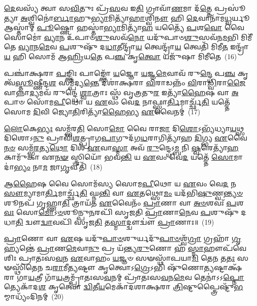{\anuvakamend[{\-\ul{𑌵𑌾}\-𑌚𑍋 𑌹𑌵᳴\-\ul{𑌮}\-𑌭𑌿𑌘𑍃᳴𑌤𑌾𑌨𑌾𑌂 𑌗𑍃𑌹𑍍𑌣𑌾\-\ul{𑌤𑍍𑌯𑍁}\-𑌤 𑌪𑌞𑍍𑌚᳴𑌵𑌿𑍞𑌶𑌤𑌿𑌶𑍍𑌚}]}%

\-\ul{𑌦𑍇}\-𑌵𑌸𑍍𑌯᳴ 𑌤𑍍𑌵𑌾 𑌸\-\ul{𑌵𑌿}\-𑌤𑍁𑌃 𑌪𑍍𑌰᳴\-\ul{𑌸}\-𑌵 𑌇\-\ul{𑌤𑌿} 𑌗𑍍𑌰𑌾𑌵𑌾᳴\-\ul{𑌣}\-𑌮𑌾 𑌦᳴\-\ul{𑌤𑍍𑌤𑍇} 𑌪𑍍𑌰𑌸𑍂॑𑌤𑍍𑌯𑌾 \ul{𑌅}\-𑌶𑍍𑌵𑌿𑌨𑍋॑\-\ul{𑌰𑍍𑌬𑌾}\-𑌹𑍁\-\ul{𑌭𑍍𑌯𑌾}\-𑌮𑌿𑌤𑍍𑌯𑌾᳴\-\ul{𑌹𑌾}\-𑌶𑍍𑌵𑌿\-\ul{𑌨𑍗} 𑌹𑌿 \ul{𑌦𑍇}\-𑌵𑌾𑌨𑌾᳴𑌮\-\ul{𑌧𑍍𑌵}\-𑌰𑍍𑌯𑍂 𑌆𑌸𑍍𑌤𑌾॑𑌮𑍍 \ul{𑌪𑍂}\-𑌷𑍍𑌣𑍋 𑌹𑌸𑍍𑌤𑌾॑\-\ul{𑌭𑍍𑌯𑌾}\-𑌮𑌿𑌤𑍍𑌯𑌾᳴\-\ul{𑌹} 𑌯𑌤𑍍𑌯𑍈᳴ \ul{𑌪}\-𑌶\-\ul{𑌵𑍋} 𑌵𑍈 𑌸𑍋𑌮𑍋॑ \ul{𑌵𑍍𑌯𑌾}\-𑌨 𑌉᳴𑌪𑌾𑍞\-\ul{𑌶𑍁}\-𑌸𑌵᳴\-\ul{𑌨𑍋} 𑌯𑌦𑍁᳴𑌪𑌾𑍞\-\ul{𑌶𑍁}\-𑌸𑌵᳴𑌨\-\ul{𑌮}\-𑌭𑌿 𑌮𑌿𑌮𑍀᳴𑌤𑍇 \ul{𑌵𑍍𑌯𑌾}\-𑌨\-\ul{𑌮𑍇}\-𑌵 \ul{𑌪}\-𑌶𑍁𑌷𑍁᳴ 𑌦\-\ul{𑌧𑌾}\-𑌤𑍀𑌨𑍍𑌦𑍍𑌰𑌾᳴\-\ul{𑌯} 𑌤𑍍𑌵𑍇𑌨𑍍𑌦𑍍𑌰𑌾᳴\-\ul{𑌯} 𑌤𑍍𑌵𑍇𑌤𑌿᳴ 𑌮𑌿𑌮𑍀\-\ul{𑌤} 𑌇𑌨𑍍𑌦𑍍𑌰𑌾᳴\-\ul{𑌯} 𑌹𑌿 𑌸𑍋𑌮᳴ 𑌆\-\ul{𑌹𑍍𑌰𑌿}\-𑌯\-\ul{𑌤𑍇} 𑌪\-\ul{𑌞𑍍𑌚} 𑌕𑍃\-\ul{𑌤𑍍𑌵𑍋} 𑌯𑌜𑍁᳴𑌷𑌾 𑌮𑌿𑌮𑍀𑌤𑍇~(16)

𑌪𑌞𑍍𑌚𑌾॑𑌕𑍍𑌷𑌰𑌾 \ul{𑌪}\-𑌙𑍍𑌕𑍍𑌤𑌿𑌃 𑌪𑌾𑌙𑍍𑌕𑍍𑌤𑍋᳴ \ul{𑌯}\-𑌜𑍍𑌞𑍋 \ul{𑌯}\-𑌜𑍍𑌞\-\ul{𑌮𑍇}\-𑌵𑌾𑌵᳴ 𑌰𑍁\-\ul{𑌨𑍍𑌦𑍍𑌧𑍇} 𑌪\-\ul{𑌞𑍍𑌚} 𑌕𑍃𑌤𑍍𑌵᳴\-\ul{𑌸𑍍𑌤𑍂}\-𑌷𑍍𑌣𑍀𑌨𑍍𑌦\-\ul{𑌶} 𑌸𑌮𑍍𑌪᳴𑌦𑍍𑌯\-\ul{𑌨𑍍𑌤𑍇} 𑌦𑌶𑌾॑𑌕𑍍𑌷𑌰𑌾 \ul{𑌵𑌿}\-𑌰𑌾𑌡𑌨𑍍𑌨𑌂᳴ \ul{𑌵𑌿}\-𑌰𑌾\-\ul{𑌡𑍍𑌵𑌿}\-𑌰𑌾\-\ul{𑌜𑍈}\-𑌵𑌾𑌨𑍍𑌨𑌾\-\ul{𑌦𑍍𑌯}\-𑌮𑌵᳴ 𑌰𑍁𑌨𑍍𑌦𑍍𑌧𑍇 \ul{𑌶𑍍𑌵𑌾}\-𑌤𑍍𑌰𑌾𑌃 𑌸𑍍𑌥᳴ 𑌵𑍃\-\ul{𑌤𑍍𑌰}\-𑌤𑍁\-\ul{𑌰} 𑌇𑌤𑍍𑌯𑌾᳴\-\ul{𑌹𑍈}\-𑌷 𑌵𑌾 \ul{𑌅}\-𑌪𑌾𑍞 𑌸𑍋᳴𑌮\-\ul{𑌪𑍀}\-𑌥𑍋 𑌯 \ul{𑌏}\-𑌵𑌂 𑌵𑍇\-\ul{𑌦} 𑌨𑌾𑌫𑍍𑌸𑍍𑌵𑌾\-\ul{𑌰𑍍𑌤𑌿}\-𑌮𑌾𑌰𑍍𑌚𑍍𑌛᳴\-\ul{𑌤𑌿} 𑌯𑌤𑍍𑌤𑍇᳴ 𑌸𑍋𑌮 \ul{𑌦𑌿}\-𑌵𑌿 𑌜𑍍𑌯𑍋\-\ul{𑌤𑌿}\-𑌰𑌿𑌤𑍍𑌯𑌾᳴\-\ul{𑌹𑍈}\-𑌭𑍍𑌯 \ul{𑌏}\-𑌵𑍈𑌨𑌮𑍍॑~(17)

\-\ul{𑌲𑍋}\-𑌕𑍇\-\ul{𑌭𑍍𑌯𑌃} 𑌸𑌮𑍍𑌭᳴𑌰\-\ul{𑌤𑌿} 𑌸𑍋\-\ul{𑌮𑍋} 𑌵𑍈 𑌰𑌾\-\ul{𑌜𑌾} 𑌦𑌿\-\ul{𑌶𑍋}\-\-𑌽𑌭𑍍𑌯᳴𑌧𑍍𑌯𑌾\-\ul{𑌯}\-𑌥𑍍𑌸 𑌦𑌿𑌶𑍋\-𑌽\-\ul{𑌨𑍁} 𑌪𑍍𑌰𑌾𑌵𑌿᳴\-\ul{𑌶}\-𑌤𑍍𑌪𑍍𑌰𑌾𑌗\-\ul{𑌪𑌾}\-𑌗𑍁𑌦᳴𑌗\-\ul{𑌧}\-𑌰𑌾𑌗𑌿𑌤𑍍𑌯𑌾᳴𑌹 \ul{𑌦𑌿}\-𑌗𑍍𑌭𑍍𑌯 \ul{𑌏}\-𑌵𑍈\-\ul{𑌨}\-\-\ul{𑍞} 𑌸𑌮𑍍𑌭᳴\-\ul{𑌰}\-𑌤𑍍𑌯\-\ul{𑌥𑍋} 𑌦𑌿𑌶᳴ \ul{𑌏}\-𑌵𑌾\-\ul{𑌸𑍍𑌮𑌾} 𑌅𑌵᳴ \ul{𑌰𑍁}\-𑌨𑍍𑌦𑍍𑌧𑍇\-𑌽\-\ul{𑌮𑍍𑌬} 𑌨𑌿 \ul{𑌷𑍍𑌵}\-𑌰𑍇𑌤𑍍𑌯𑌾᳴\-\ul{𑌹} 𑌕𑌾𑌮𑍁᳴𑌕𑌾 𑌏\-\ul{𑌨}\-\-\ul{𑍟} 𑌸𑍍𑌤𑍍𑌰𑌿𑌯𑍋᳴ 𑌭𑌵\-\ul{𑌨𑍍𑌤𑌿} 𑌯 \ul{𑌏}\-𑌵𑌂 𑌵𑍇\-\ul{𑌦} 𑌯𑌤𑍍𑌤𑍇᳴ \ul{𑌸𑍋}\-𑌮𑌾𑌦𑌾॑\-\ul{𑌭𑍍𑌯𑌂} 𑌨𑌾\-\ul{𑌮} 𑌜𑌾\-\ul{𑌗𑍃}\-𑌵𑍀𑌤𑌿᳴~(18)

\-\ul{𑌆}\-\-\ul{𑌹𑍈}\-𑌷 𑌵𑍈 𑌸𑍋𑌮᳴𑌸𑍍𑌯 𑌸𑍋𑌮\-\ul{𑌪𑍀}\-𑌥𑍋 𑌯 \ul{𑌏}\-𑌵𑌂 𑌵𑍇\-\ul{𑌦} 𑌨 \ul{𑌸𑍗}\-𑌮𑍍𑌯𑌾𑌮𑌾\-\ul{𑌰𑍍𑌤𑌿}\-𑌮𑌾𑌰𑍍𑌚𑍍𑌛᳴\-\ul{𑌤𑌿} 𑌘𑍍𑌨\-\ul{𑌨𑍍𑌤𑌿} 𑌵𑌾 \ul{𑌏}\-𑌤𑌥𑍍𑌸𑍋\-\ul{𑌮𑌂} 𑌯𑌦᳴𑌭𑌿\-\ul{𑌷𑍁}\-𑌣𑍍𑌵\-\ul{𑌨𑍍𑌤𑍍𑌯}\-\-\ul{𑍞}\-𑌶𑍂𑌨𑌪᳴ 𑌗𑍃𑌹𑍍𑌣𑌾\-\ul{𑌤𑌿} 𑌤𑍍𑌰𑌾𑌯᳴𑌤 \ul{𑌏}\-𑌵𑍈𑌨𑌂᳴ \ul{𑌪𑍍𑌰𑌾}\-𑌣𑌾 𑌵𑌾 \ul{𑌅}\-\-\ul{𑍞}\-𑌶𑌵𑌃᳴ \ul{𑌪}\-𑌶\-\ul{𑌵𑌃} 𑌸𑍋\-\ul{𑌮𑍋}\-\-𑌽\-\ul{𑍞}\-𑌶𑍂𑌨𑍍𑌪𑍁\-\ul{𑌨}\-𑌰𑌪𑌿᳴ 𑌸𑍃𑌜𑌤𑌿 \ul{𑌪𑍍𑌰𑌾}\-𑌣𑌾\-\ul{𑌨𑍇}\-𑌵 \ul{𑌪}\-𑌶𑍁𑌷𑍁᳴ 𑌦𑌧𑌾\-\ul{𑌤𑌿} 𑌦𑍍𑌵𑍗\-\ul{𑌦𑍍𑌵𑌾}\-𑌵𑌪𑌿᳴ 𑌸𑍃𑌜\-\ul{𑌤𑌿} 𑌤\-\ul{𑌸𑍍𑌮𑌾}\-𑌦𑍍𑌦𑍍𑌵𑍗𑌦𑍍𑌵𑍗॑ \ul{𑌪𑍍𑌰𑌾}\-𑌣𑌾𑌃॥~(19)

{\anuvakamend[{𑌯𑌜𑍁᳴𑌷𑌾 𑌮𑌿𑌮𑍀𑌤 𑌏\-\ul{𑌨𑌂} 𑌜𑌾\-\ul{𑌗𑍃}\-𑌵𑍀\-\ul{𑌤𑌿} 𑌚𑌤𑍁᳴𑌶𑍍𑌚𑌤𑍍𑌵𑌾𑌰𑌿𑍞𑌶𑌚𑍍𑌚}]}%

\-\ul{𑌪𑍍𑌰𑌾}\-𑌣𑍋 𑌵𑌾 \ul{𑌏}\-𑌷 𑌯𑌦𑍁᳴\-\ul{𑌪𑌾}\-\-\ul{𑍞}\-𑌶𑍁𑌰𑍍𑌯𑌦𑍁᳴\-\ul{𑌪𑌾}\-\-\ul{𑍞}\-𑌶𑍍𑌵᳴\-\ul{𑌗𑍍𑌰𑌾} 𑌗𑍍𑌰𑌹𑌾᳴ \ul{𑌗𑍃}\-𑌹𑍍𑌯𑌨𑍍𑌤𑍇॑ \ul{𑌪𑍍𑌰𑌾}\-𑌣\-\ul{𑌮𑍇}\-𑌵𑌾\-\ul{𑌨𑍁} 𑌪𑍍𑌰 𑌯᳴𑌨𑍍𑌤𑍍𑌯\-\ul{𑌰𑍁}\-𑌣𑍋 𑌹᳴ \ul{𑌸𑍍𑌮𑌾}\-𑌹𑍗𑌪᳴𑌵𑍇𑌶𑌿𑌃 𑌪𑍍𑌰𑌾𑌤𑌃𑌸\-\ul{𑌵}\-𑌨 \ul{𑌏}\-𑌵𑌾𑌹𑌂 \ul{𑌯}\-𑌜𑍍𑌞𑍞 𑌸𑍟𑌸𑍍𑌥𑌾᳴𑌪𑌯𑌾\-\ul{𑌮𑌿} 𑌤𑍇\-\ul{𑌨} 𑌤\-\ul{𑌤𑌃} 𑌸𑍟𑌸𑍍𑌥𑌿᳴𑌤𑍇𑌨 𑌚\-\ul{𑌰𑌾}\-𑌮𑍀\-\ul{𑌤𑍍𑌯}\-𑌷𑍍𑌟𑍗 𑌕𑍃𑌤𑍍𑌵𑍋\-𑌽\-\ul{𑌗𑍍𑌰𑍇}\-\-𑌽𑌭𑌿 𑌷𑍁᳴𑌣𑍋\-\ul{𑌤𑍍𑌯}\-𑌷𑍍𑌟𑌾𑌕𑍍𑌷᳴𑌰𑌾 𑌗𑌾\-\ul{𑌯}\-𑌤𑍍𑌰𑍀 𑌗𑌾᳴\-\ul{𑌯}\-𑌤𑍍𑌰𑌮𑍍𑌪𑍍𑌰𑌾᳴𑌤𑌃𑌸\-\ul{𑌵}\-𑌨𑌮𑍍 𑌪𑍍𑌰𑌾᳴𑌤𑌃𑌸\-\ul{𑌵}\-𑌨\-\ul{𑌮𑍇}\-𑌵 𑌤𑍇𑌨𑌾॑𑌽𑌽\-\ul{𑌪𑍍𑌨𑍋}\-𑌤𑍍𑌯𑍇𑌕𑌾᳴\-𑌦\-\ul{𑌶} 𑌕𑍃𑌤𑍍𑌵𑍋॑ \ul{𑌦𑍍𑌵𑌿}\-𑌤𑍀\-\ul{𑌯}\-𑌮𑍇𑌕𑌾᳴\-𑌦𑌶𑌾𑌕𑍍𑌷𑌰𑌾 \ul{𑌤𑍍𑌰𑌿}\-𑌷𑍍𑌟𑍁𑌪𑍍𑌤𑍍𑌰𑍈𑌷𑍍𑌟𑍁᳴\-\ul{𑌭}\-𑌮𑍍𑌮𑌾𑌧𑍍𑌯𑌂᳴𑌦𑌿𑌨𑌮𑍍~(20)

